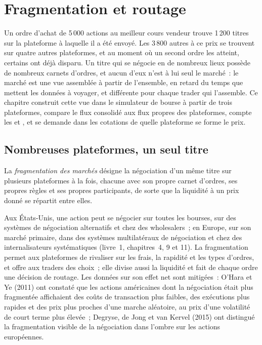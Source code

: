 \chapter{Fragmentation et routage}\label{ch:mx:fragmentation-and-routing}

Un ordre d'achat de 5\,000 actions au meilleur cours vendeur trouve 1\,200 titres sur la plateforme à laquelle il a été envoyé. Les 3\,800 autres à ce prix se trouvent sur quatre autres plateformes, et au moment où
un second ordre les atteint, certains ont déjà disparu. Un titre qui se négocie en de nombreux lieux possède de nombreux carnets d'ordres, et aucun d'eux n'est à lui seul le marché~:
le marché est une vue assemblée à partir de l'ensemble, en retard du temps que mettent les données à voyager, et différente pour chaque trader qui l'assemble. Ce
chapitre construit cette vue dans le simulateur de bourse à partir de trois plateformes, compare le flux consolidé aux flux propres des plateformes, compte les  et
, et se demande dans les cotations de quelle plateforme se forme le prix.

\section{Nombreuses plateformes, un seul titre}

\begin{definition}\label{def:mx:fragmentation-and-routing:fragmentation}
La \emph{fragmentation des marchés} désigne la négociation d'un même titre sur plusieurs plateformes à la fois, chacune avec son propre carnet d'ordres,
ses propres règles et ses propres participants, de sorte que la liquidité à un prix donné se répartit entre elles.
\end{definition}

Aux États-Unis, une action peut se négocier sur toutes les bourses, sur des systèmes de négociation alternatifs et chez des wholesalers~; en Europe, sur son marché primaire,
dans des systèmes multilatéraux de négociation et chez des internalisateurs systématiques (livre~1, chapitres~4, 9 et 11). La fragmentation permet aux plateformes de rivaliser sur les frais, la rapidité et les types d'ordres,
et offre aux traders des choix~; elle divise aussi la liquidité et fait de chaque ordre une décision de routage. Les données sur son effet net sont mitigées~:
O'Hara et Ye (2011) ont constaté que les actions américaines dont la négociation était plus fragmentée affichaient des coûts de transaction plus faibles, des exécutions plus rapides et des prix plus proches d'une marche aléatoire,
au prix d'une volatilité de court terme plus élevée~; Degryse, de Jong et van Kervel (2015) ont distingué la fragmentation visible de la négociation dans l'ombre sur les actions européennes.

